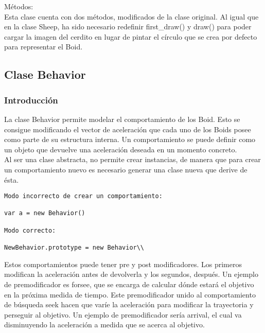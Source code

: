 Métodos:\\

Esta clase cuenta con dos métodos, modificados de la clase original. Al igual que en la clase Sheep, ha sido necesario redefinir 
first\_draw() y draw() para poder cargar la imagen del cerdito en lugar de pintar el círculo que se crea por defecto para representar el 
Boid.



\subsection{Clase Behavior}
\label{subsection:behavior_section}

\subsubsection{Introducción}
\label{subsubsection:behavior}

La clase Behavior permite modelar el comportamiento de los Boid. Esto se consigue modificando el vector de aceleración que cada uno de los 
Boids posee como parte de su estructura interna. Un comportamiento se puede definir como un objeto que devuelve una aceleración deseada en 
un momento concreto.\\

Al ser una clase abstracta, no permite crear instancias, de manera que para crear un comportamiento nuevo es necesario generar una clase 
nueva que derive de ésta.

\begin{verbatim}
Modo incorrecto de crear un comportamiento:

var a = new Behavior()

Modo correcto:

NewBehavior.prototype = new Behavior\\
\end{verbatim}

Estos comportamientos puede tener pre y post modificadores. Los primeros modifican la aceleración antes de devolverla y los segundos,
después. Un ejemplo de premodificador es forsee, que se encarga de calcular dónde estará el objetivo en la próxima medida de tiempo. Este 
premodificador unido al comportamiento de búsqueda seek hacen que varíe la aceleración para modificar la trayectoria y perseguir al objetivo. 
Un ejemplo de premodificador sería arrival, el cual va disminuyendo la aceleración a medida que se acerca al objetivo.\\

